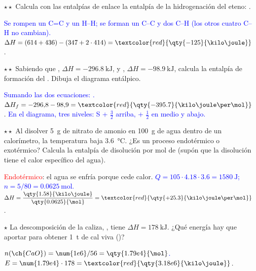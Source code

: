 \begin{exercise}
    \(\star\star\) Calcula con las entalpías de enlace la entalpía de la hidrogenación del eteno:
    .
    \begin{solu}
        \textcolor{blue}{Se rompen un C=C y un H--H; se forman un C--C y dos C--H (los otros cuatro C--H no cambian).}
        \(\Delta H = (614 + 436) - (347 + 2 \cdot 414) = \textcolor{red}{\qty{-125}{\kilo\joule}}\).
    \end{solu}
\end{exercise}

\begin{exercise}
    \(\star\star\) Sabiendo que , \(\Delta H = \qty{-296.8}{\kilo\joule}\), y
    , \(\Delta H = \qty{-98.9}{\kilo\joule}\), calcula la entalpía de formación del .
    Dibuja el diagrama entálpico.
    \begin{solu}
        \textcolor{blue}{Sumando las dos ecuaciones: .} \(\Delta H_f = -296{,}8 - 98{,}9 =
        \textcolor{red}{\qty{-395.7}{\kilo\joule\per\mol}}\). \textcolor{blue}{En el diagrama, tres niveles: S + \(\frac{3}{2}\)
        arriba,  + \(\frac{1}{2}\) en medio y  abajo.}
    \end{solu}
\end{exercise}

\begin{exercise}
    \(\star\star\) Al disolver \qty{5}{\gram} de nitrato de amonio en \qty{100}{\gram} de agua dentro de un calorímetro, la
    temperatura baja \qty{3.6}{\degreeCelsius}. ¿Es un proceso endotérmico o exotérmico? Calcula la entalpía de disolución por mol
    de  (supón que la disolución tiene el calor específico del agua).
    \begin{solu}
        \textcolor{red}{Endotérmico}: el agua se enfría porque cede calor. \textcolor{blue}{\(Q = 105 \cdot \num{4.18} \cdot \num{3.6} =
        \qty{1580}{\joule}\); \(n = 5/80 = \qty{0.0625}{\mol}\).} \(\Delta H = \dfrac{\qty{1.58}{\kilo\joule}}{\qty{0.0625}{\mol}} =
        \textcolor{red}{\qty{+25.3}{\kilo\joule\per\mol}}\).
    \end{solu}
\end{exercise}

\begin{exercise}
    \(\star\) La descomposición de la caliza, , tiene \(\Delta H = \qty{+178}{\kilo\joule}\).
    ¿Qué energía hay que aportar para obtener \qty{1}{\tonne} de cal viva ()?
    \begin{solu}
        \textcolor{blue}{\(n(\ch{CaO}) = \num{1e6}/56 = \qty{1.79e4}{\mol}\).} \(E = \num{1.79e4} \cdot 178 =
        \textcolor{red}{\qty{3.18e6}{\kilo\joule}}\).
    \end{solu}
\end{exercise}

